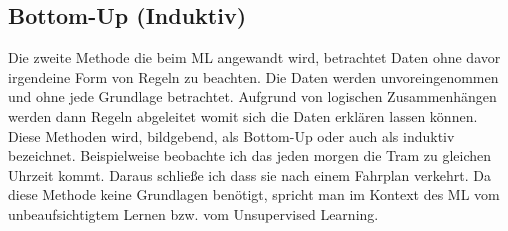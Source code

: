 \documentclass[12pt,german,ngerman]{report}
\begin{document}
           
        
    \subsection{Bottom-Up (Induktiv)}
        Die zweite Methode die beim ML angewandt wird, betrachtet Daten ohne davor irgendeine Form von Regeln zu beachten.  
        Die Daten werden unvoreingenommen und ohne jede Grundlage betrachtet.
        Aufgrund von logischen Zusammenhängen werden dann Regeln abgeleitet womit sich die Daten erklären lassen können.
        Diese Methoden wird, bildgebend, als Bottom-Up oder auch als induktiv\cite{dundi2021unileipzig} bezeichnet.
        Beispielweise beobachte ich das jeden morgen die Tram zu gleichen Uhrzeit kommt. Daraus schließe ich 
        dass sie nach einem Fahrplan verkehrt. Da diese Methode keine Grundlagen benötigt, spricht man
        im Kontext des ML vom unbeaufsichtigtem Lernen bzw. vom Unsupervised Learning.
\end{document}
